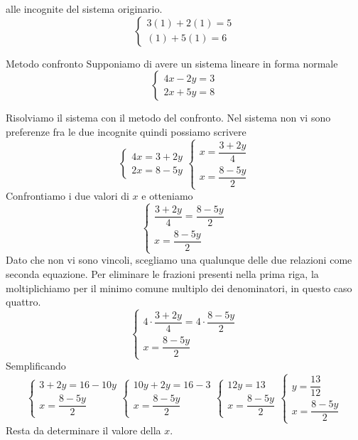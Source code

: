 alle incognite del sistema originario.
\[
\begin{cases}
3(1)+2(1)=5\\
(1)+5(1)=6
\end{cases}
\]
 \begin{esempiot}{Metodo confronto}{}                  
	Supponiamo di avere un sistema lineare in forma normale
	\[
	\begin{cases}
	4x-2y=3\\
	2x+5y=8
	\end{cases}
	\]
\end{esempiot}
Risolviamo il sistema con il metodo del confronto. Nel sistema non vi sono preferenze fra le due incognite quindi
possiamo scrivere	\[
\begin{cases}
4x=3+2y\\
2x=8-5y
\end{cases}
\begin{cases}
x=\dfrac{3+2y}{4}\\
x=\dfrac{8-5y}{2}
\end{cases}
\]
Confrontiamo i due valori di $x$ e otteniamo
\[
\begin{cases}
\dfrac{3+2y}{4}=\dfrac{8-5y}{2}\\
x=\dfrac{8-5y}{2}
\end{cases}
\]Dato che non vi sono vincoli, scegliamo una qualunque delle due relazioni come seconda equazione.
Per eliminare le frazioni presenti nella prima riga, la moltiplichiamo per il minimo comune multiplo dei denominatori, in questo caso quattro. \[
\begin{cases}
4\cdot\dfrac{3+2y}{4}=4\cdot\dfrac{8-5y}{2}\\
x=\dfrac{8-5y}{2}
\end{cases}
\]
Semplificando
\[
\begin{cases}
3+2y=16-10y\\
x=\dfrac{8-5y}{2}
\end{cases}
\begin{cases}
10y+2y=16-3\\
x=\dfrac{8-5y}{2}
\end{cases}
\begin{cases}
12y=13\\
x=\dfrac{8-5y}{2}
\end{cases}
\begin{cases}
y=\dfrac{13}{12}\\
x=\dfrac{8-5y}{2}
\end{cases}
\]
Resta da determinare il valore della $x$. 
